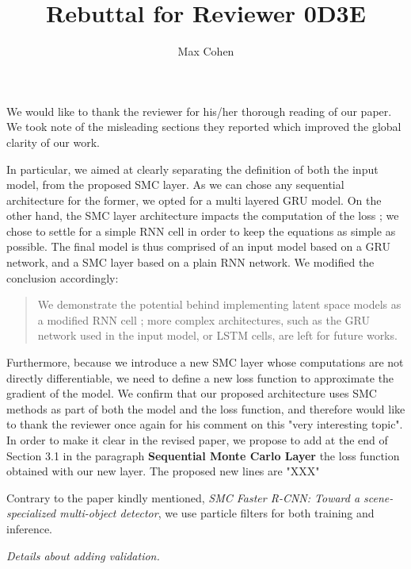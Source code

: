 \documentclass{article}
\title{Rebuttal for Reviewer 0D3E}
\author{Max Cohen}
\affil{Samovar, T\'el\'ecom SudParis, CITI, TIPIC, Institut Polyechnique de Paris}
\date{}
\begin{document}
\maketitle

We would like to thank the reviewer for his/her thorough reading of our paper.
We took note of the misleading sections they reported which improved the global clarity of our work.

In particular, we aimed at clearly separating the definition of both the input model, from the proposed SMC layer.
As we can chose any sequential architecture for the former, we opted for a multi layered GRU model.
On the other hand, the SMC layer architecture impacts the computation of the loss ; we chose to settle for a simple RNN cell in order to keep the equations as simple as possible.
The final model is thus comprised of an input model based on a GRU network, and a SMC layer based on a plain RNN network.
We modified the conclusion accordingly:
\begin{quote}
We demonstrate the potential behind implementing latent space models as a modified RNN cell ;
more complex architectures, such as the GRU network used in the input model, or LSTM cells, are left for future works.
\end{quote}

Furthermore, because we introduce a new SMC layer whose computations are not directly differentiable, we need to define a new loss function to approximate the gradient of the model. We confirm that our proposed architecture uses SMC methods as part of both the model and the loss function, and therefore would like to thank the reviewer once again for his comment on this "very interesting topic". In order to make it clear in the revised  paper, we propose to add at the end of Section 3.1 in the paragraph {\bf Sequential Monte Carlo Layer} the loss function obtained with our new layer. The proposed new lines are "XXX"



Contrary to the paper kindly mentioned, \textit{SMC Faster R-CNN: Toward a scene-specialized multi-object detector}, we use particle filters for both training and inference.

\textit{Details about adding validation.}



\end{document}
